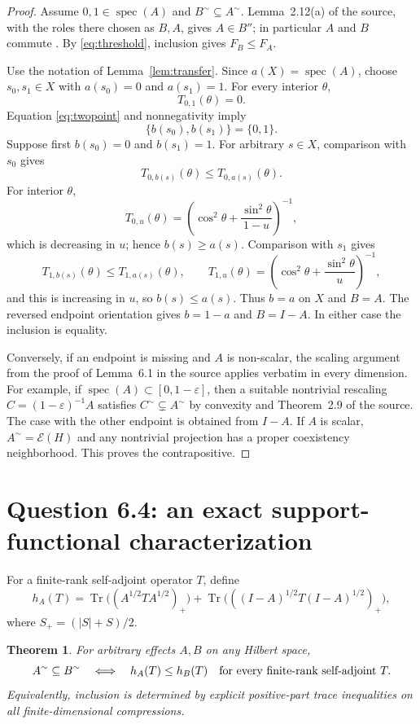 \documentclass[11pt]{article}
\newtheorem{theorem}{Theorem}
\newcommand{\E}{\mathcal E}
\newcommand{\Tr}{\operatorname{Tr}}
\newcommand{\spec}{\operatorname{spec}}
\newcommand{\coex}{\mathord{\sim}}
\begin{document}
\begin{proof}
Assume $0,1\in\spec(A)$ and $B^{\coex}\subseteq A^{\coex}$.  Lemma~2.12(a) of the source, with the roles there chosen as $B,A$, gives $A\in B''$; in particular $A$ and $B$ commute \cite{GS}.  By \eqref{eq:threshold}, inclusion gives $F_B\le F_A$.

Use the notation of Lemma~\ref{lem:transfer}.  Since $a(X)=\spec(A)$, choose $s_0,s_1\in X$ with $a(s_0)=0$ and $a(s_1)=1$.  For every interior $\theta$,
\[
 T_{0,1}(\theta)=0.
\]
Equation \eqref{eq:twopoint} and nonnegativity imply
\[
 \{b(s_0),b(s_1)\}=\{0,1\}.
\]
Suppose first $b(s_0)=0$ and $b(s_1)=1$.  For arbitrary $s\in X$, comparison with $s_0$ gives
\[
 T_{0,b(s)}(\theta)\le T_{0,a(s)}(\theta).
\]
For interior $\theta$,
\[
 T_{0,u}(\theta)=
 \left(\cos^2\theta+\frac{\sin^2\theta}{1-u}\right)^{-1},
\]
which is decreasing in $u$; hence $b(s)\ge a(s)$.  Comparison with $s_1$ gives
\[
 T_{1,b(s)}(\theta)\le T_{1,a(s)}(\theta),\qquad
 T_{1,u}(\theta)=
 \left(\cos^2\theta+\frac{\sin^2\theta}{u}\right)^{-1},
\]
and this is increasing in $u$, so $b(s)\le a(s)$.  Thus $b=a$ on $X$ and $B=A$.  The reversed endpoint orientation gives $b=1-a$ and $B=I-A$.  In either case the inclusion is equality.

Conversely, if an endpoint is missing and $A$ is non-scalar, the scaling argument from the proof of Lemma~6.1 in the source applies verbatim in every dimension.  For example, if $\spec(A)\subset[0,1-\varepsilon]$, then a suitable nontrivial rescaling $C=(1-\varepsilon)^{-1}A$ satisfies $C^{\coex}\subsetneq A^{\coex}$ by convexity and Theorem~2.9 of the source.  The case with the other endpoint is obtained from $I-A$.  If $A$ is scalar, $A^{\coex}=\E(H)$ and any nontrivial projection has a proper coexistency neighborhood.  This proves the contrapositive.
\end{proof}

\section{Question 6.4: an exact support-functional characterization}

For a finite-rank self-adjoint operator $T$, define
\begin{equation}\label{eq:support}
 h_A(T)=
 \Tr\bigl((A^{1/2}TA^{1/2})_+\bigr)
 +\Tr\bigl(((I-A)^{1/2}T(I-A)^{1/2})_+\bigr),
\end{equation}
where $S_+=(|S|+S)/2$.

\begin{theorem}\label{thm:inclusion}
For arbitrary effects $A,B$ on any Hilbert space,
\begin{equation}\label{eq:characterization}
 A^{\coex}\subseteq B^{\coex}
 \quad\Longleftrightarrow\quad
 h_A(T)\le h_B(T)
 \quad\hbox{for every finite-rank self-adjoint }T.
\end{equation}
Equivalently, inclusion is determined by explicit positive-part trace inequalities on all finite-dimensional compressions.
\end{theorem}
\end{document}
